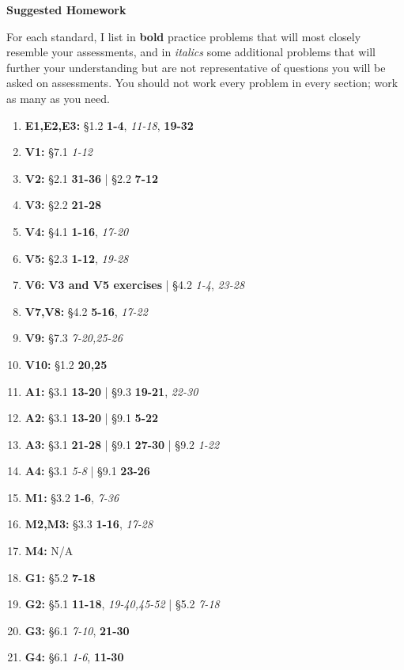 \documentclass{article}
\begin{document}
\begin{center}
\Large \textbf{Suggested Homework}
\end{center}

\newcommand{\closeExamples}{\textbf}
\newcommand{\otherExamples}{\textit}
\newcommand{\standards}[1]{\item[\textbf{#1}]}

For each standard, I list in \closeExamples{bold} practice problems that will most closely resemble your assessments, and in \otherExamples{italics} some additional problems that will further your understanding but are not representative of questions you will be asked on assessments.  You should not work every problem in every section; work as many as you need.

\begin{enumerate}
  \standards{E1,E2,E3:} \S 1.2
    \closeExamples{1-4},
    \otherExamples{11-18},
    \closeExamples{19-32}


  \standards{V1:} \S 7.1
    \otherExamples{1-12}

  \standards{V2:} \S 2.1
    \closeExamples{31-36}
    | \S 2.2
    \closeExamples{7-12}

  \standards{V3:} \S 2.2
    \closeExamples{21-28}

  \standards{V4:} \S 4.1
    \closeExamples{1-16},
    \otherExamples{17-20}

  \standards{V5:} \S 2.3
    \closeExamples{1-12},
    \otherExamples{19-28}

  \standards{V6:}
    \closeExamples{\textbf{V3} and \textbf{V5} exercises}
    | \S 4.2
    \otherExamples{1-4},
    \otherExamples{23-28}

  \standards{V7,V8:} \S 4.2
    \closeExamples{5-16},
    \otherExamples{17-22}

   \standards{V9:} \S 7.3 \otherExamples{7-20,25-26}

   \standards{V10:} \S 1.2 \closeExamples{20,25}

  \standards{A1:} \S 3.1 \closeExamples{13-20} | \S 9.3 \closeExamples{19-21}, \otherExamples{22-30}
  \standards{A2:} \S 3.1 \closeExamples{13-20} | \S 9.1 \closeExamples{5-22}
  \standards{A3:} \S 3.1 \closeExamples{21-28} | \S 9.1 \closeExamples{27-30} | \S 9.2 \otherExamples{1-22}
  \standards{A4:} \S 3.1 \otherExamples{5-8} | \S 9.1 \closeExamples{23-26}
  \standards{M1:} \S 3.2 \closeExamples{1-6}, \otherExamples{7-36}
  \standards{M2,M3:} \S 3.3 \closeExamples{1-16}, \otherExamples{17-28}
  \standards{M4:} N/A
  \standards{G1:} \S 5.2 \closeExamples{7-18}
  \standards{G2:} \S 5.1 \closeExamples{11-18}, \otherExamples{19-40,45-52} | \S 5.2 \otherExamples{7-18}
  \standards{G3:} \S 6.1 \otherExamples{7-10}, \closeExamples{21-30}
  \standards{G4:} \S 6.1 \otherExamples{1-6}, \closeExamples{11-30}
\end{enumerate}
\end{document}
